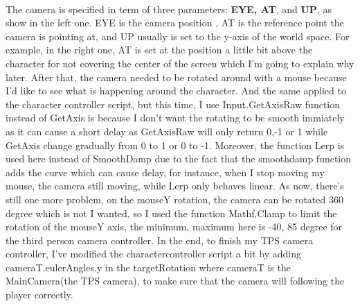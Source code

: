 \documentclass[a4paper, 13pt]{extarticle}
\begin{document}
  	\\[0.05cm]
 	 The camera is specified in term of three parameters: {\bfseries EYE, AT}, and {\bfseries UP}, as show in the left one. EYE is the camera position , AT is the reference point the camera is pointing at, and UP usually is set to the y-axis of the world space. For example, in the right one, AT is set at the position a little bit above the character for not covering the center of the screen which I'm going to explain why later.
 	 After that, the camera needed to be rotated around with a mouse because I'd like to see what is happening around the character. And the same applied to the character controller script, but this time, I use Input.GetAxisRaw function instead of GetAxis is because I don't want the rotating to be smooth immiately as it can cause a short delay as GetAxisRaw will only return 0,-1 or 1 while GetAxis change gradually from 0 to 1 or 0 to -1.  
 	 Moreover, the function Lerp is used here instead of SmoothDamp due to the fact that the smoothdamp function adds the curve which can cause delay, for instance, when I stop moving my mouse, the camera still moving, while Lerp only behaves linear. As now, there's still one more problem, on the mouseY rotation, the camera can be rotated 360 degree which is not I wanted, so I used the function Mathf.Clamp to limit the rotation of the mouseY axis, the minimum, maximum here is -40, 85 degree for the third person camera controller. In the end, to finish my TPS camera controller, I've modified the charactercontroller script a bit by adding cameraT.eulerAngles.y in the targetRotation where cameraT is the MainCamera(the TPS camera), to make sure that the camera will following the player correctly.
 	 
\end{document}
